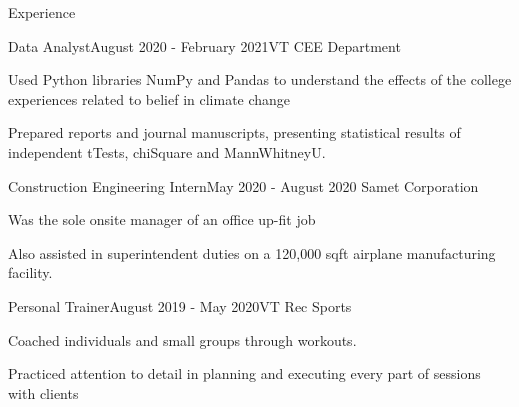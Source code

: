 \documentclass{resume} %
\begin{document}
\begin{rSection}{Experience}

\begin{rSubsection}{Data Analyst}{August 2020 - February 2021}{VT CEE Department}{}
\item Used Python libraries NumPy and Pandas to understand the effects of the college experiences related to belief in climate change 
\item Prepared reports and journal manuscripts, presenting statistical results of independent tTests, chiSquare and MannWhitneyU.
\end{rSubsection}


\begin{rSubsection}{Construction Engineering Intern}{May 2020 - August 2020}{ Samet Corporation}{}
\item Was the sole onsite manager of an office up-fit job 
\item Also assisted in superintendent duties on a 120,000 sqft airplane manufacturing facility. 
\end{rSubsection}



\begin{rSubsection}{Personal Trainer}{August 2019 - May 2020}{VT Rec Sports}{}
\item Coached individuals and small groups through workouts. 
\item Practiced attention to detail in planning and executing every part of sessions with clients 
\end{rSubsection}

\end{rSection}
\end{document}
